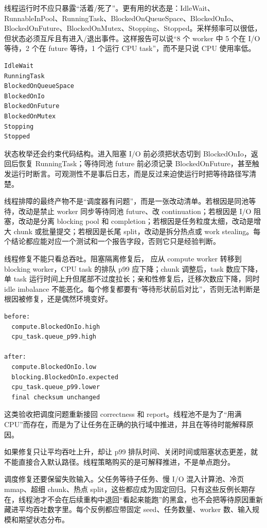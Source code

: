 线程运行时不应只暴露“活着/死了”。更有用的状态是：IdleWait、RunnableInPool、RunningTask、BlockedOnQueueSpace、BlockedOnIo、BlockedOnFuture、BlockedOnMutex、Stopping、Stopped。采样频率可以很低，但状态必须互斥且有进入/退出事件。这样报告可以说“8 个 worker 中 5 个在 I/O 等待，2 个在 future 等待，1 个运行 CPU task”，而不是只说 CPU 使用率低。

\begin{lstlisting}[numbers=none,caption={WorkerState 枚举示例}]
IdleWait
RunningTask
BlockedOnQueueSpace
BlockedOnIo
BlockedOnFuture
BlockedOnMutex
Stopping
Stopped
\end{lstlisting}

状态枚举还会约束代码结构。进入阻塞 I/O 前必须把状态切到 BlockedOnIo，返回后恢复 RunningTask；等待同池 future 前必须记录 BlockedOnFuture，甚至触发运行时断言。可观测性不是事后日志，而是反过来迫使运行时把等待路径写清楚。

线程排障的最终产物不是“调度器有问题”，而是一张改动清单。若根因是同池等待，改动是禁止 worker 同步等待同池 future、改 continuation；若根因是 I/O 阻塞，改动是分离 blocking pool 和 completion；若根因是任务粒度太细，改动是增大 chunk 或批量提交；若根因是长尾 split，改动是拆分热点或 work stealing。每个结论都应能对应一个测试和一个报告字段，否则它只是经验判断。

线程修复不能只看总吞吐。阻塞隔离修复后， 应从 compute worker 转移到 blocking worker，CPU task 的排队 p99 应下降；chunk 调整后，task 数应下降，单 task 运行时间上升但尾部不过度拉长；亲和性修复后，迁移次数应下降，同时 idle imbalance 不能恶化。每个修复都要有“等待形状前后对比”，否则无法判断是根因被修复，还是偶然环境变好。

\begin{lstlisting}[numbers=none,caption={线程修复验收摘要}]
before:
  compute.BlockedOnIo.high
  cpu_task.queue_p99.high

after:
  compute.BlockedOnIo.low
  blocking.BlockedOnIo.expected
  cpu_task.queue_p99.lower
  final checksum unchanged
\end{lstlisting}

这类验收把调度问题重新接回 correctness 和 report。线程池不是为了“用满 CPU”而存在，而是为了让任务在正确的执行域中推进，并且在等待时能解释原因。

如果修复只让平均吞吐上升，却让 p99 排队时间、关闭时间或阻塞状态更差，就不能直接合入默认路径。线程策略购买的是可解释推进，不是单点跑分。

调度修复还要保留失败输入。父任务等待子任务、慢 I/O 混入计算池、冷页 mmap、超细 chunk、热点 split，这些都应成为固定回归。只有这些反例长期存在，线程池才不会在后续重构中退回“看起来能跑”的黑盒，也不会把等待原因重新藏进平均吞吐数字里。每个反例都应带固定 seed、任务数量、worker 数、输入规模和期望状态分布。


